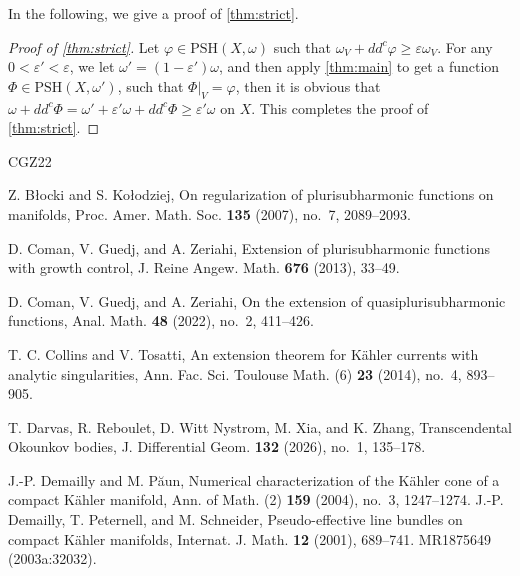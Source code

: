 \documentclass[12pt,reqno]{amsart}
\begin{document}
	In the following, we give a proof of \cref{thm:strict}.
	\begin{proof}[Proof of \cref{thm:strict}]
		Let $\varphi\in \mbox{PSH}(X,\omega)$ such that $\omega_V+dd^c\varphi\geq \varepsilon\omega_V$. For any $0<\varepsilon'<\varepsilon$, we let $\omega'=(1-\varepsilon')\omega$, and then apply \cref{thm:main} to get a function $\Phi\in \mbox{PSH}(X,\omega')$, such that $\Phi|_V=\varphi$, then it is obvious that $\omega+dd^c\Phi=\omega'+\varepsilon'\omega+dd^c\Phi\geq \varepsilon'\omega$ on $X$. This completes the proof of \cref{thm:strict}.
	\end{proof}
	
	
	
	
	
	\begin{thebibliography}{CGZ22}
		
		Z. B{\l}ocki and S. Ko{\l}odziej,
		On regularization of plurisubharmonic functions on manifolds,
		Proc. Amer. Math. Soc. {\bf 135} (2007), no.~7, 2089--2093.
		
		D. Coman, V. Guedj, and A. Zeriahi,
		Extension of plurisubharmonic functions with growth control,
		J. Reine Angew. Math. {\bf 676} (2013), 33--49.
		
		D. Coman, V. Guedj, and A. Zeriahi,
		On the extension of quasiplurisubharmonic functions,
		Anal. Math. {\bf 48} (2022), no.~2, 411--426.
		
		T. C. Collins and V. Tosatti,
		An extension theorem for K\"ahler currents with analytic singularities,
		Ann. Fac. Sci. Toulouse Math. (6) {\bf 23} (2014), no.~4, 893--905.
		
		T. Darvas, R. Reboulet, D. Witt Nystrom, M. Xia, and K. Zhang,
		Transcendental Okounkov bodies,
		J. Differential Geom. {\bf 132} (2026), no.~1, 135--178.
		
		
		
		
		
		J.-P. Demailly and M. P\u{a}un,
		Numerical characterization of the K\"ahler cone of a compact K\"ahler manifold,
		Ann. of Math. (2) {\bf 159} (2004), no.~3, 1247--1274.
		J.-P. Demailly, T. Peternell, and M. Schneider,
		Pseudo-effective line bundles on compact K\"ahler manifolds,
		Internat. J. Math. {\bf 12} (2001), 689--741. MR1875649 (2003a:32032).


\end{thebibliography}
\end{document}
